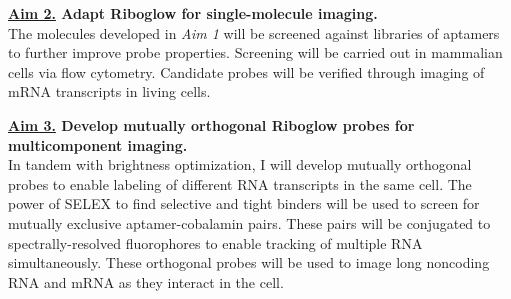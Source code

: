 {\bf \underline{Aim 2.} Adapt Riboglow for single-molecule imaging.}\\
The molecules developed in \textit{Aim 1} will be screened against libraries of aptamers to further improve probe properties. Screening will be carried out in mammalian cells via flow cytometry. Candidate probes will be verified through imaging of mRNA transcripts in living cells.

{\bf \underline{Aim 3.} Develop mutually orthogonal Riboglow probes for multicomponent imaging.}\\
In tandem with brightness optimization, I will develop mutually orthogonal probes to enable labeling of different RNA transcripts in the same cell. The power of SELEX to find selective and tight binders will be used to screen for mutually exclusive aptamer-cobalamin pairs. These pairs will be conjugated to spectrally-resolved fluorophores to enable tracking of multiple RNA simultaneously. These orthogonal probes will be used to image long noncoding RNA and mRNA as they interact in the cell.

